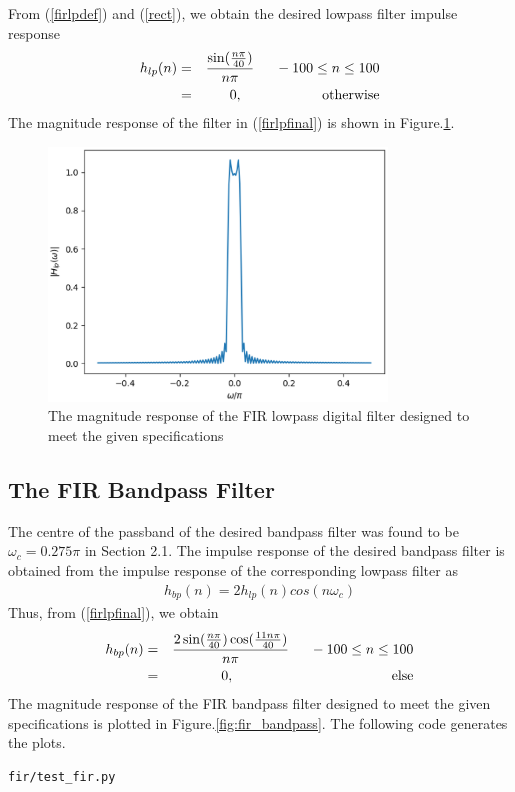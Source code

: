 \documentclass[journal,12pt,twocolumn]{IEEEtran}
\begin{document}
From (\ref{firlpdef}) and (\ref{rect}), we obtain the desired lowpass filter impulse response
\begin{eqnarray}
\label{firlpfinal}
h_{lp}(n) &=& \frac{\sin(\frac{n\pi}{40})}{n\pi} \indent -100 \leq n \leq 100 \nonumber \\
&=& 0, \hspace{2cm} \mbox{otherwise}
\end{eqnarray}
The magnitude  response of the filter in (\ref{firlpfinal}) is shown in Figure.\ref{fig:fir_lowpass}.
\begin{figure}
    \centering
    \includegraphics[width = 9cm]{./figs/fir/ee18btech11035_fir_lp.eps}
    \caption{The magnitude response of the FIR lowpass digital filter designed to meet the given specifications} 
    \label{fig:fir_lowpass}
\end{figure}

\subsection{The FIR Bandpass Filter}
The centre of the passband of the desired bandpass filter was found to be $\omega_c = 0.275\pi$ in Section
2.1.  The impulse response of the desired bandpass filter is obtained from the impulse response of the
corresponding lowpass filter as
\begin{eqnarray}
h_{bp}(n) = 2h_{lp}(n)cos(n\omega_c)
\end{eqnarray}
Thus, from (\ref{firlpfinal}), we obtain
\begin{eqnarray}
\label{firbpfinal}
h_{bp}(n) &=& \frac{2\sin(\frac{n\pi}{40}) \cos(\frac{11n\pi}{40})}{n\pi} \indent -100 \leq n \leq 100 \nonumber \\
&=& 0, \hspace{4cm} \mbox{else}
\end{eqnarray}
%
The magnitude response of the FIR bandpass filter designed to meet the given specifications is plotted in Figure.\ref{fig:fir_bandpass}.
The following code generates the plots.
\begin{lstlisting}
fir/test_fir.py
\end{lstlisting}
\end{document}
